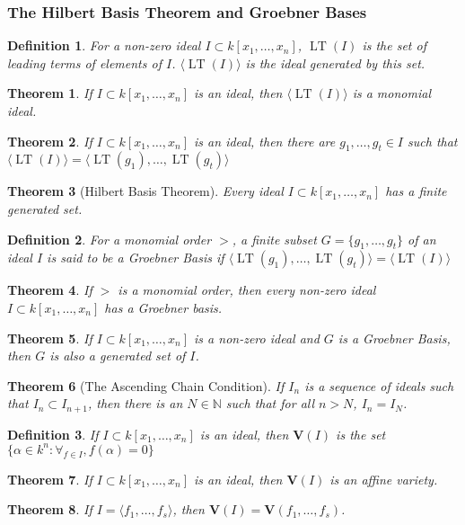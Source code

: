 \documentclass{article}
\theoremstyle{mystyle}
\newtheorem{theorem}{Theorem}[section]
\newtheorem{definition}{Definition}[section]
\DeclareMathOperator{\LT}{LT}
\begin{document}
\subsubsection{The Hilbert Basis Theorem and Groebner Bases}
\begin{definition}
For a non-zero ideal $I\subset k[x_1,\hdots ,x_n]$, $\LT(I)$ is the set of leading terms of elements of $I$. $\langle \LT(I)\rangle$ is the ideal generated by this set.
\end{definition}
\begin{theorem}
If $I\subset k[x_1,\hdots ,x_n]$ is an ideal, then $\langle \LT(I)\rangle$ is a monomial ideal.
\end{theorem}
\begin{theorem}
If $I\subset k[x_1,\hdots ,x_n]$ is an ideal, then there are $g_1,\hdots, g_t\in I$ such that $\langle \LT(I)\rangle = \langle \LT(g_1),\hdots, \LT(g_t)\rangle$
\end{theorem}
\begin{theorem}[Hilbert Basis Theorem]
Every ideal $I\subset k[x_1,\hdots ,x_n]$ has a finite generated set.
\end{theorem}
\begin{definition}
For a monomial order $>$, a finite subset $G=\{g_1,\hdots, g_t\}$ of an ideal $I$ is said to be a Groebner Basis if $\langle \LT(g_1),\hdots, \LT(g_t)\rangle = \langle \LT(I)\rangle$
\end{definition}
\begin{theorem}
If $>$ is a monomial order, then every non-zero ideal $I\subset k[x_1,\hdots ,x_n]$ has a Groebner basis.
\end{theorem}
\begin{theorem}
If $I\subset k[x_1,\hdots ,x_n]$ is a non-zero ideal and $G$ is a Groebner Basis, then $G$ is also a generated set of $I$.
\end{theorem}
\begin{theorem}[The Ascending Chain Condition]
If $I_n$ is a sequence of ideals such that $I_{n}\subset I_{n+1}$, then there is an $N\in \mathbb{N}$ such that for all $n>N$, $I_n = I_N$.
\end{theorem}
\begin{definition}
If $I\subset k[x_1,\hdots ,x_n]$ is an ideal, then $\textbf{V}(I)$ is the set $\{\alpha \in k^n: \forall_{f\in I},f(\alpha) = 0\}$
\end{definition}
\begin{theorem}
If $I\subset k[x_1,\hdots ,x_n]$ is an ideal, then $\textbf{V}(I)$ is an affine variety.
\end{theorem}
\begin{theorem}
If $I = \langle f_1,\hdots, f_s\rangle$, then $\textbf{V}(I) = \mathbf{V}(f_1,\hdots, f_s)$.
\end{theorem}
\end{document}
